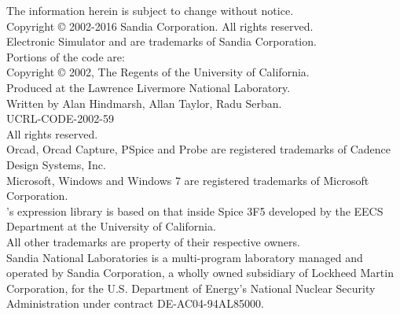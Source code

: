 \documentclass{article}
\begin{document}
\vspace*{\fill}
The information herein is subject to change without notice.\\[0.5em]
Copyright \copyright{} 2002-2016 Sandia Corporation.  All rights
reserved.\\[0.5em]
\XyceTM{} Electronic Simulator and \XyceTM{} are trademarks of Sandia
Corporation.\\[0.5em]
Portions of the \XyceTM{} code are:  \\
Copyright \copyright{} 2002, The Regents of the University of California. \\
Produced at the Lawrence Livermore National Laboratory. \\
Written by Alan Hindmarsh, Allan Taylor, Radu Serban. \\
UCRL-CODE-2002-59 \\
All rights reserved. \\[0.5em]
Orcad, Orcad Capture, PSpice and Probe are registered trademarks of Cadence
Design Systems, Inc.\\[0.5em]
Microsoft, Windows and Windows 7 are registered trademarks of Microsoft
Corporation.\\[0.5em]
\Xyce{}'s expression library is based on that inside Spice 3F5 developed by
the
EECS Department at the University of California. \\[0.5em]
All other trademarks are property of their respective owners. \\

\vspace*{\fill}
Sandia National Laboratories is a multi-program laboratory managed and
operated by Sandia Corporation, a wholly owned subsidiary of Lockheed Martin
Corporation, for the U.S. Department of Energy's National Nuclear Security
Administration under contract DE-AC04-94AL85000.
\end{document}

